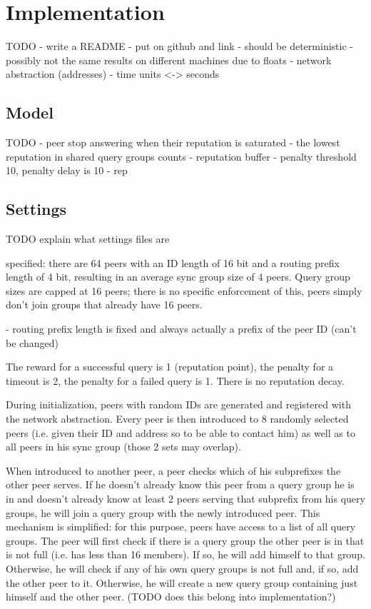 \chapter{Implementation}
\label{chap:implementation}
TODO
- write a README
- put on github and link
- should be deterministic
- possibly not the same results on different machines due to floats
- network abstraction (addresses)
- time units <-> seconds

\section{Model}
TODO
- peer stop answering when their reputation is saturated
- the lowest reputation in shared query groups counts
- reputation buffer
- penalty threshold 10, penalty delay is 10 - rep
\section{Settings}
TODO explain what settings files are

specified: there are 64 peers with an ID length of 16 bit and a routing prefix
length of 4 bit, resulting in an average sync group size of 4 peers. Query group
sizes are capped at 16 peers; there is no specific enforcement of this, peers
simply don't join groups that already have 16 peers.

- routing prefix length is fixed and always actually a prefix of the peer ID
  (can't be changed)

The reward for a successful query is 1 (reputation point), the penalty for a
timeout is 2, the penalty for a failed query is 1. There is no reputation decay.

During initialization, peers with random IDs are generated and registered with
the network abstraction. Every peer is then introduced to 8 randomly selected
peers (i.e. given their ID and address so to be able to contact him) as well as
to all peers in his sync group (those 2 sets may overlap).

When introduced to another peer, a peer checks which of his subprefixes the
other peer serves. If he doesn't already know this peer from a query group he is
in and doesn't already know at least 2 peers serving that subprefix from his
query groups, he will join a query group with the newly introduced peer. This
mechanism is simplified: for this purpose, peers have access to a list of all
query groups. The peer will first check if there is a query group the other peer
is in that is not full (i.e. has less than 16 members). If so, he will add
himself to that group. Otherwise, he will check if any of his own query groups
is not full and, if so, add the other peer to it. Otherwise, he will create a
new query group containing just himself and the other peer. (TODO does this
belong into implementation?)

